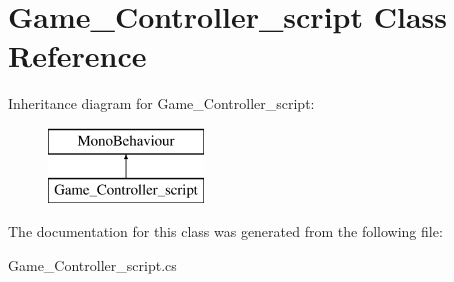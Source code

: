 \hypertarget{class_game___controller__script}{}\section{Game\+\_\+\+Controller\+\_\+script Class Reference}
\label{class_game___controller__script}
Inheritance diagram for Game\+\_\+\+Controller\+\_\+script\+:\begin{figure}[H]
\begin{center}
\leavevmode
\includegraphics[height=2.000000cm]{class_game___controller__script}
\end{center}
\end{figure}


The documentation for this class was generated from the following file\+:\begin{DoxyCompactItemize}
\item 
Game\+\_\+\+Controller\+\_\+script.\+cs\end{DoxyCompactItemize}
